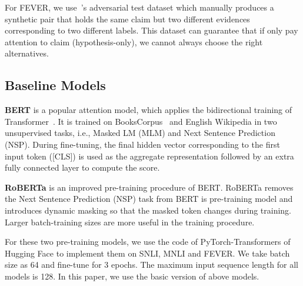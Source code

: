 For FEVER, we use~\cite{schuster2019towards}'s 
adversarial test dataset which manually produces a synthetic pair that 
holds the same claim but 
two different evidences corresponding to two different labels.
This dataset can guarantee that if only pay attention to claim (hypothesis-only), we 
cannot always choose the right alternatives.

\subsection{Baseline Models}
\textbf{BERT} is a popular attention model, which applies the bidirectional training of Transformer~\cite{vaswani2017attention}. 
It is trained on BooksCorpus~\cite{zhu2015aligning} and English Wikipedia in two unsupervised
tasks, i.e., Masked LM (MLM) and Next Sentence Prediction (NSP). During fine-tuning, the final
hidden vector corresponding to the first input token ([CLS]) is used as the aggregate representation
followed by an extra fully connected layer to compute the score.

\textbf{RoBERTa} is an improved pre-training procedure of BERT. 
RoBERTa removes the Next Sentence Prediction (NSP) task from 
BERT is pre-training model and introduces dynamic masking so that the 
masked token changes during training. 
Larger batch-training sizes are more useful in the training procedure.

For these two pre-training models, we use the code of PyTorch-Transformers of Hugging Face to implement them on SNLI, MNLI and FEVER. We take batch size as 64 and fine-tune for 3 epochs. The maximum input sequence length for all
models is 128. In this paper, we use the basic version of above models. 

